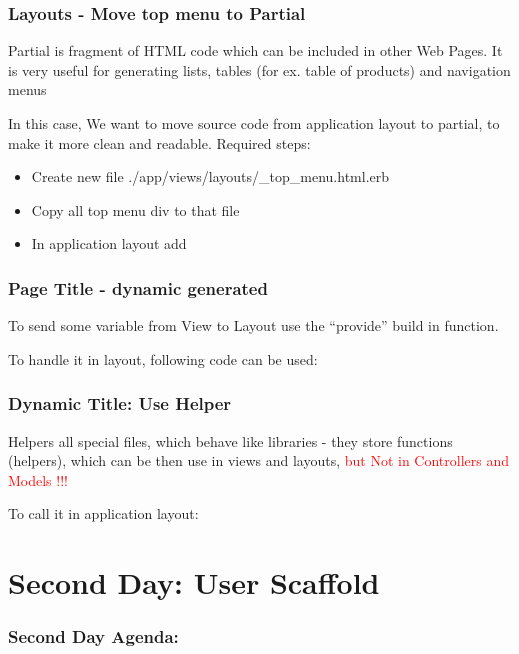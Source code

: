 \documentclass{beamer}
\theoremstyle{mystyle}
\begin{document}
\begin{frame}
  \frametitle{Layouts - Move top menu to Partial}
  \begin{definition}
    Partial is fragment of HTML code which can be included in other Web Pages.
    It is very useful for generating lists, tables (for ex. table of products)
    and navigation menus 
  \end{definition}
  In this case, We want to move source code from application layout to partial,
  to make it more clean and readable.
  Required steps:
  \begin{itemize}
    \item Create new file ./app/views/layouts/\_top\_menu.html.erb
    \item Copy all top menu div to that file
    \item In application layout add \railspartial
  \end{itemize}

\end{frame}

\begin{frame}
  \frametitle{Page Title - dynamic generated}
  \begin{definition}
    To send some variable from View to Layout use the ``provide'' build in function. 
  \end{definition}
  \railsprovide
  To handle it in layout, following code can be used:
  \railslayouthandletitle
\end{frame}

\begin{frame}
  \frametitle{Dynamic Title: Use Helper}
  \begin{definition}
    Helpers all special files, which behave like libraries - they store
    functions (helpers), which can be then use in views and layouts, 
    \textcolor{red}{but Not in Controllers and Models !!!}
  \end{definition}
  \railshelperI
  To call it in application layout:
  \railstitlehelperinlayout
\end{frame}


\section{Second Day: User Scaffold}
    \begin{frame}
      \frametitle{Second Day Agenda:}
      \tableofcontents
      [
      currentsection,
      sectionstyle=hide/hide,
      subsectionstyle=show/show/hide
      ]
    \end{frame}
\end{document}
